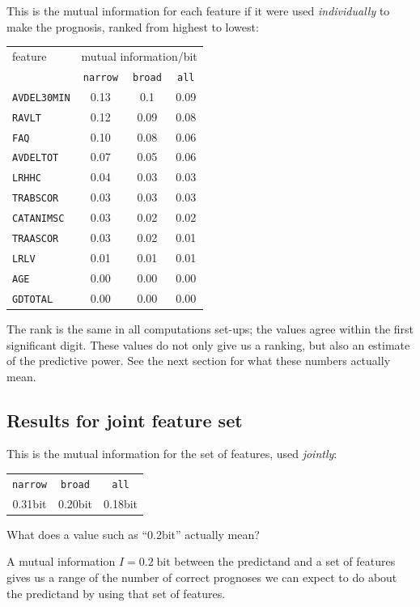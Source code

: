 \documentclass[\ifafour a4paper,12pt,\else a5paper,10pt,\fi%
onecolumn,oneside,article,%
british%
]{memoir}
\theoremstyle{remark}
\theoremstyle{innote}
\renewcommand*{\|}[1][]{\nonscript\:#1\vert\nonscript\:\mathopen{}}
\newcommand*{\bit}{\textrm{bit}}
\newcommand*{\narrow}{\texttt{narrow}}
\newcommand*{\broad}{\texttt{broad}}
\newcommand*{\all}{\texttt{all}}
\begin{document}
This is the mutual information for each feature if it were used
\emph{individually} to make the prognosis, ranked
from highest to lowest:
\begin{center}
  \begin{tabular}[c]{l|ccc}
    feature &\multicolumn{3}{c}{mutual information/bit} \\
    & \narrow & \broad & \all \\
\hline
    \texttt{AVDEL30MIN} & 0.13 & 0.1 & 0.09\\
    \texttt{RAVLT} & 0.12 & 0.09 & 0.08\\
    \texttt{FAQ} & 0.10 & 0.08 & 0.06\\
    \texttt{AVDELTOT} & 0.07 & 0.05 & 0.06\\
    \texttt{LRHHC} & 0.04 & 0.03 & 0.03\\
    \texttt{TRABSCOR} & 0.03 & 0.03 & 0.03\\
    \texttt{CATANIMSC} & 0.03 & 0.02 & 0.02\\
    \texttt{TRAASCOR} & 0.03 & 0.02 & 0.01\\
    \texttt{LRLV} & 0.01 & 0.01 & 0.01\\
    \texttt{AGE} & 0.00 & 0.00 & 0.00\\
    \texttt{GDTOTAL} & 0.00 & 0.00 & 0.00
  \end{tabular}                            
\end{center}
The rank is the same in all computations set-ups; the values agree within
the first significant digit. These values do not only give us a ranking,
but also an estimate of the predictive power. See the next section for what these
numbers actually mean.

\subsection{Results for joint feature set}
\label{sec:joint}

This is the mutual information for the set of features, used \emph{jointly}:
\begin{center}
  \begin{tabular}[c]{ccc}
    \narrow & \broad & \all \\
    0.31\;\bit & 0.20\;\bit & 0.18\;bit
  \end{tabular}
\end{center}

What does a value such as \enquote{0.2\;\bit} actually mean?

A mutual information $I=0.2\;\bit$ between the predictand and a set of
features gives us a range of the number of correct prognoses we can
expect to do about the predictand by using that set of features.
\end{document}
